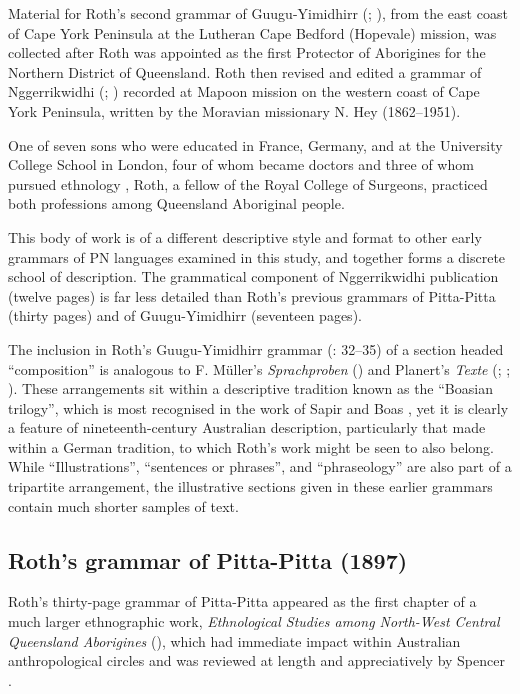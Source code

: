 Material for Roth’s second grammar of Guugu-Yimidhirr (\citeyear{roth_structure_1901}; ), from the east coast of Cape York Peninsula at the Lutheran Cape Bedford (Hopevale) mission, was collected after Roth was appointed as the first Protector of Aborigines for the Northern District of Queensland. Roth then revised and edited a grammar of Nggerrikwidhi (\citeyear{hey_elementary_1903}; ) recorded at Mapoon mission on the western coast of Cape York Peninsula, written by the Moravian missionary N. Hey (1862–1951).

One of seven sons who were educated in France, Germany, and at the University College School in London, four of whom became doctors and three of whom pursued ethnology \citep{Reynolds2008}, Roth, a fellow of the Royal College of Surgeons, practiced both professions among Queensland Aboriginal people.

This body of work is of a different descriptive style and format to other early grammars of PN languages examined in this study, and together forms a discrete school of description. The grammatical component of  Nggerrikwidhi publication (twelve pages) is far less detailed than Roth’s previous grammars of Pitta-Pitta (thirty pages) and of Guugu-Yimidhirr (seventeen pages).

The inclusion in Roth’s Guugu-Yimidhirr grammar (\citeyear{roth_structure_1901}: 32--35) of a section headed “composition” is analogous to F. Müller’s \textit{Sprachproben} (\citeyear{muller_grundris_1882}) and Planert’s \textit{Texte} (\citeyear{planert_australische_1907}; \citeyear{planert_australische_1908}; ). These arrangements sit within a descriptive tradition known as the “Boasian trilogy'', which is most recognised in the work of Sapir and Boas \citep[8--9]{darnell_indo-european_1999}, yet it is clearly a feature of nineteenth-century Australian description, particularly that made within a German tradition, to which Roth’s work might be seen to also belong. While  “Illustrations”,  “sentences or phrases'', and  “phraseology” are also part of a tripartite arrangement, the illustrative sections given in these earlier grammars contain much shorter samples of text.

\subsection{Roth’s grammar of Pitta-Pitta (1897)}
\label{sec:key:10.1.1}\label{bkm:Ref74727849}\label{bkm:Ref516423738}\label{bkm:Ref516157801}\label{bkm:Ref516157715}\label{bkm:Ref514607076}\label{bkm:Ref514606874}\label{bkm:Ref514606224}
Roth’s thirty-page grammar of Pitta-Pitta appeared as the first chapter of a much larger ethnographic work, \textit{Ethnological Studies among North-West Central Queensland Aborigines} (\citeyear{roth_ethnological_1897}), which had immediate impact within Australian anthropological circles and was reviewed at length and appreciatively by Spencer \citep[110--112]{mulvaney_oxford_2008}.

